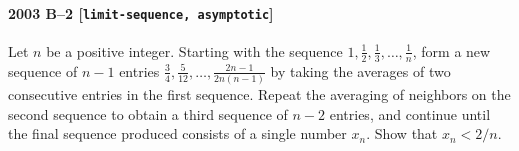 \paragraph{2003 B--2 \textnormal{[\texttt{limit-sequence, asymptotic}]}}
Let $n$ be a positive integer. Starting with the sequence
$1, \frac{1}{2}, \frac{1}{3}, \dots, \frac{1}{n}$,
form a new sequence of $n-1$ entries
$\frac{3}{4}, \frac{5}{12}, \dots, \frac{2n-1}{2n(n-1)}$
by taking the averages of
two consecutive entries in the first sequence. Repeat the
averaging of neighbors on the second sequence to obtain a third
sequence of $n-2$ entries, and continue until the final sequence produced
consists of a single number $x_n$. Show that $x_n < 2/n$.
